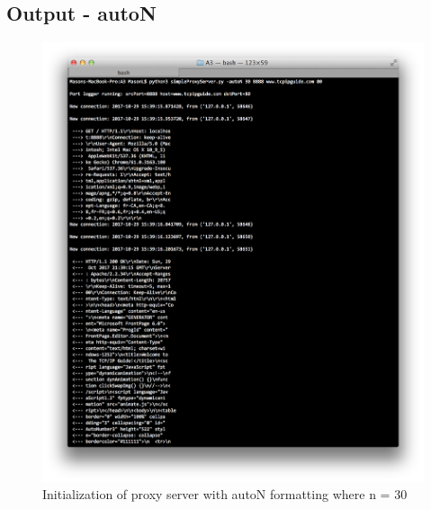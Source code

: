\documentclass[11pt]{article}
\begin{document}
	\subsection{Output - autoN}
	\begin{figure}[H]
	\includegraphics[scale=0.5, trim={0cm 0cm 0cm 0cm}, clip]{autoN_output}
	\caption{Initialization of proxy server with autoN formatting where n = 30}
	\end{figure}
	
\end{document}

